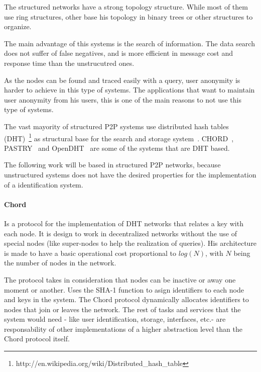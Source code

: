 The structured networks have a strong topology structure. While most of them
use ring structures, other base his topology in binary trees or other
structures to organize.

The main advantage of this systems is the search of information. The data search does not
suffer of false negatives, and is more efficient in message cost and response
time than the unstrucutred ones. 

As the nodes can be found and traced easily with a query, user anonymity is harder to
achieve in this type of systems.  The applications that want to maintain user
anonymity from his users, this is one of the main reasons to not use this type
of systems.

The vast mayority of structured P2P systems use distributed hash tables
(DHT)~\footnote{http://en.wikipedia.org/wiki/Distributed\_hash\_table} as
structural base for the search and storage system~\cite{BalakrishnanEtAl03}.
CHORD~\cite{conf:hotos:DabekBKKMSB01},
PASTRY~\cite{oai:CiteSeerPSU:441779} and 
OpenDHT~\cite{Rhea:2005:OPD:1080091.1080102}
are some of the systems that are DHT based.

The following work will be based in structured P2P networks, because unstructured
systems does not have the desired properties for the implementation of a
identification system. 

\paragraph{Chord}
\label{sec:chord}

Is a protocol for the implementation of DHT networks that relates a key with
each node. It is design to work in decentralized networks without the use of
special nodes (like super-nodes to help the realization of queries). His
architecture is made to have a basic operational cost proportional to $log(N)$,
with $N$ being the number of nodes in the network.

The protocol takes in consideration that nodes can be inactive or away one
moment or another. Uses the SHA-1 function to asign identifiers to each node
and keys in the system. The Chord protocol dynamically allocates identifiers to nodes that
join or leaves the network. The rest of tasks and services that the system
would need - like user identification, storage, interfaces, etc.- are
responsability of other implementations of a higher abstraction level than the
Chord protocol itself.

